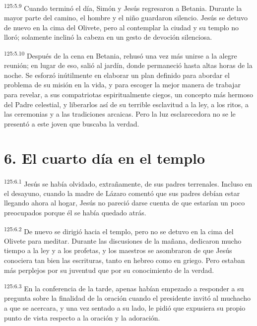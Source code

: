 \par 
\textsuperscript{125:5.9} Cuando terminó el día, Simón y Jesús regresaron a Betania. Durante la mayor parte del camino, el hombre y el niño guardaron silencio. Jesús se detuvo de nuevo en la cima del Olivete, pero al contemplar la ciudad y su templo no lloró; solamente inclinó la cabeza en un gesto de devoción silenciosa.

\par 
\textsuperscript{125:5.10} Después de la cena en Betania, rehusó una vez más unirse a la alegre reunión; en lugar de eso, salió al jardín, donde permaneció hasta altas horas de la noche. Se esforzó inútilmente en elaborar un plan definido para abordar el problema de su misión en la vida, y para escoger la mejor manera de trabajar para revelar, a sus compatriotas espiritualmente ciegos, un concepto más hermoso del Padre celestial, y liberarlos así de su terrible esclavitud a la ley, a los ritos, a las ceremonias y a las tradiciones arcaicas. Pero la luz esclarecedora no se le presentó a este joven que buscaba la verdad.

\section*{6. El cuarto día en el templo}
\par 
\textsuperscript{125:6.1} Jesús se había olvidado, extrañamente, de sus padres terrenales. Incluso en el desayuno, cuando la madre de Lázaro comentó que sus padres debían estar llegando ahora al hogar, Jesús no pareció darse cuenta de que estarían un poco preocupados porque él se había quedado atrás.

\par 
\textsuperscript{125:6.2} De nuevo se dirigió hacia el templo, pero no se detuvo en la cima del Olivete para meditar. Durante las discusiones de la mañana, dedicaron mucho tiempo a la ley y a los profetas, y los maestros se asombraron de que Jesús conociera tan bien las escrituras, tanto en hebreo como en griego. Pero estaban más perplejos por su juventud que por su conocimiento de la verdad.

\par 
\textsuperscript{125:6.3} En la conferencia de la tarde, apenas habían empezado a responder a su pregunta sobre la finalidad de la oración cuando el presidente invitó al muchacho a que se acercara, y una vez sentado a su lado, le pidió que expusiera su propio punto de vista respecto a la oración y la adoración.

